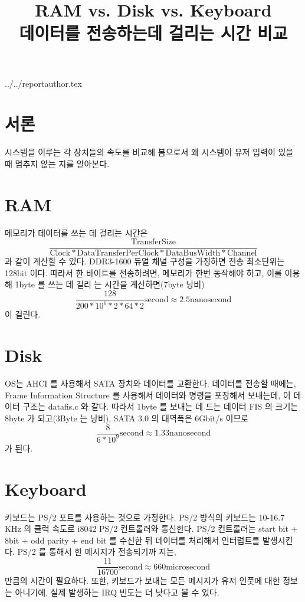 \documentclass {article}
\begin{document}
\title {RAM vs. Disk vs. Keyboard \\ 데이터를 전송하는데 걸리는 시간 비교}
 {../../reportauthor.tex}
\maketitle

\section {서론}
시스템을 이루는 각 장치들의 속도를 비교해 봄으로서 왜 시스템이 유저 입력이 있을 때 멈추지 않는 지를 알아본다.
\section {RAM}
메모리가 데이터를 쓰는 데 걸리는 시간은
\begin {equation}
  \frac {\mathrm{TransferSize}}{\mathrm{Clock} * \mathrm{DataTransferPerClock} * \mathrm{DataBusWidth} * \mathrm{Channel}}
\end {equation}
과 같이 계산할 수 있다.
DDR3-1600 듀얼 채널 구성을 가정하면 전송 최소단위는 128bit 이다.
따라서 한 바이트를 전송하려면, 메모리가 한번 동작해야 하고, 이를 이용해 1byte 를 쓰는 데 걸리\linebreak
는 시간을 계산하면(7byte 낭비)
\begin {equation}
  \frac {128}{200*10^6 * 2 * 64 * 2} \mathrm{second} \approx 2.5\mathrm{nanosecond}
\end {equation}
이 걸린다.
\section {Disk}
OS는 AHCI 를 사용해서 SATA 장치와 데이터를 교환한다. 데이터를 전송할 때에는, Frame Information Structure 를 사용해서 데이터와 명령을 포장해서 보내는데, 이 데이터 구조는
{datafis.c}
와 같다.
따라서 1byte 를 보내는 데 드는 데이터 FIS 의 크기는
8byte 가 되고(3Byte 는 낭비), SATA 3.0 의 대역폭은 6Gbit/s\cite{annjansen00} 이므로
\begin {equation}
\frac {8}{6 * 10^9} \mathrm{second} \approx 1.33 \mathrm{nanosecond}
\end {equation}
가 된다.
\section {Keyboard}
키보드는 PS/2 포트를 사용하는 것으로 가정한다.
PS/2 방식의 키보드는 10-16.7 KHz 의 클럭 속도로 i8042 PS/2 컨트롤러와 통신한다.\cite {adamchapweske00} PS/2 컨트롤러는
start bit + 8bit + odd parity + end bit 를 수신한 뒤 데이터를 처리해서 인터럽트를 발생시킨다.
PS/2 를 통해서 한 메시지가 전송되기까\linebreak
지는,
\begin {equation}
\frac{11}{16700} \mathrm{second} \approx 660 \mathrm{microsecond}
\end {equation}
만큼의 시간이 필요하다.
또한, 키보드가 보내는 모든 메시지가 유저 인풋에 대한 정보는 아니기에, 실제 발생하는 IRQ 빈도는 더 낮다고 볼 수 있다.
\end{document}
